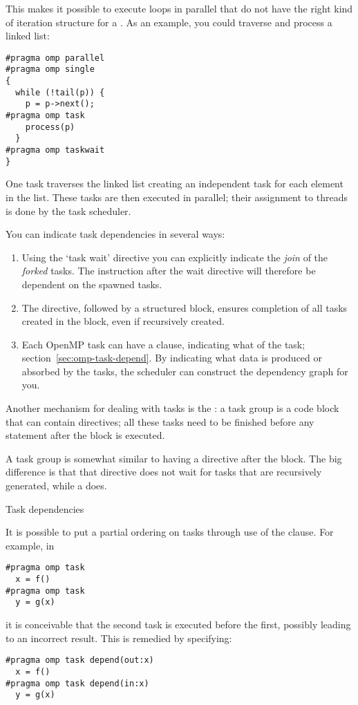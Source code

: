This makes it possible to execute loops in parallel
that do not have the right kind of iteration structure
for a . As an example, you
could traverse and process a linked list:
\begin{lstlisting}
#pragma omp parallel
#pragma omp single
{
  while (!tail(p)) {
    p = p->next();
#pragma omp task
    process(p)
  }
#pragma omp taskwait
}
\end{lstlisting}
One task traverses the linked list creating an independent
task for each element in the list. These tasks are then
executed in parallel; their assignment to threads
is done by the task scheduler.

You can indicate task dependencies in several ways:
\begin{enumerate}
\item Using the `task wait' directive you can explicitly indicate
  the \emph{join} of the
  \emph{forked} tasks. The instruction after the wait directive
  will therefore be dependent on the spawned tasks.
\item The  directive, followed
  by a structured block, ensures completion of all tasks
  created in the block, even if recursively created.
\item Each OpenMP task can have a 
  clause, indicating what  of the task;
  section~\ref{sec:omp-task-depend}.
  By indicating what data is produced or absorbed by the tasks,
  the scheduler can construct the dependency graph for you.
\end{enumerate}

Another mechanism for dealing with tasks is the
: a task group is a code block that can
contain  directives; all these tasks need to be
finished before any statement after the block is executed.

A task group is somewhat similar to having a 
directive after the block. The big difference is that that
 directive does not wait for tasks that are recursively
generated, while a  does.


 {Task dependencies}
\label{sec:omp-task-depend}

It is possible to put a partial ordering on
tasks through use of the  clause. For example, in
\begin{lstlisting}
#pragma omp task
  x = f()
#pragma omp task
  y = g(x)
\end{lstlisting}
it is conceivable that the second task is executed before the first,
possibly leading to an incorrect result. This is remedied by specifying:
\begin{lstlisting}
#pragma omp task depend(out:x)
  x = f()
#pragma omp task depend(in:x)
  y = g(x)
\end{lstlisting}

